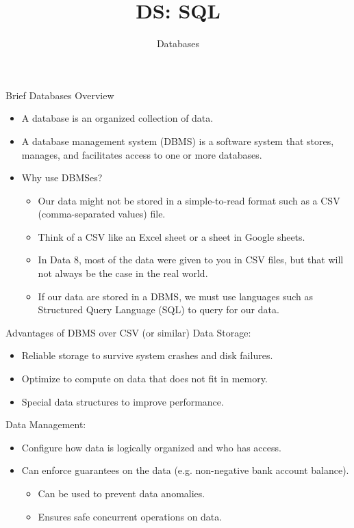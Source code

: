 \documentclass[aspectratio=169]{../latex_main/tntbeamer}  %
\title[Introduction]{DS: SQL}
\subtitle{Databases}
\begin{document}
	
	\maketitle
	\begin{frame}{Brief Databases Overview}
	    \begin{itemize}
	        \item A database is an organized collection of data.
	        \item A database management system (DBMS) is a software system that stores, manages, and facilitates access to one or more databases. 
	        \item Why use DBMSes? 
	        \begin{itemize}
	            \item Our data might not be stored in a simple-to-read format such as a CSV (comma-separated values) file.
	            \item Think of a CSV like an Excel sheet or a sheet in Google sheets.
	            \item In Data 8, most of the data were given to you in CSV files, but that will not always be the case in the real world. 
	            \item If our data are stored in a DBMS, we must use languages such as Structured Query Language  (SQL) to query for our data.
	        \end{itemize}
	    \end{itemize}
	\end{frame}   
	    
	    
	\begin{frame}{Advantages of DBMS over CSV (or similar)}
	        Data Storage:
	        \begin{itemize}
	            \item Reliable storage to survive system crashes and disk failures.
	            \item Optimize to compute on data that does not fit in memory.
	            \item Special data structures to improve performance.
	        \end{itemize}
	        Data Management:
	        \begin{itemize}
	            \item Configure how data is logically organized and who has access.
	            \item Can enforce guarantees on the data (e.g. non-negative bank account balance).
	            \begin{itemize}
	                \item Can be used to prevent data anomalies.
	                \item Ensures safe concurrent operations on data.
	            \end{itemize}
	        \end{itemize}
	\end{frame}
	
	
	
	
	
	
\end{document}
